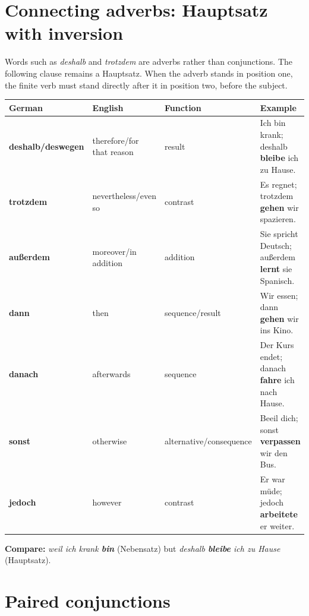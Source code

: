 \section{Connecting adverbs: Hauptsatz with inversion}

Words such as \textit{deshalb} and \textit{trotzdem} are adverbs rather than
conjunctions. The following clause remains a Hauptsatz. When the adverb stands
in position one, the finite verb must stand directly after it in position two,
before the subject.

\begin{center}
\small
{}
\begin{tabularx}{\textwidth}{@{}>{\bfseries}l l l X@{}}
\toprule
German & English & Function & Example \\
\midrule
deshalb/deswegen & therefore/for that reason & result & Ich bin krank; deshalb \textbf{bleibe} ich zu Hause. \\
trotzdem & nevertheless/even so & contrast & Es regnet; trotzdem \textbf{gehen} wir spazieren. \\
außerdem & moreover/in addition & addition & Sie spricht Deutsch; außerdem \textbf{lernt} sie Spanisch. \\
dann & then & sequence/result & Wir essen; dann \textbf{gehen} wir ins Kino. \\
danach & afterwards & sequence & Der Kurs endet; danach \textbf{fahre} ich nach Hause. \\
sonst & otherwise & alternative/consequence & Beeil dich; sonst \textbf{verpassen} wir den Bus. \\
jedoch & however & contrast & Er war müde; jedoch \textbf{arbeitete} er weiter. \\
\bottomrule
\end{tabularx}
\end{center}

\noindent
\textbf{Compare:}
\quad \textit{weil ich krank \textbf{bin}} (Nebensatz)
\quad but \quad
\textit{deshalb \textbf{bleibe} ich zu Hause} (Hauptsatz).

\section{Paired conjunctions}

